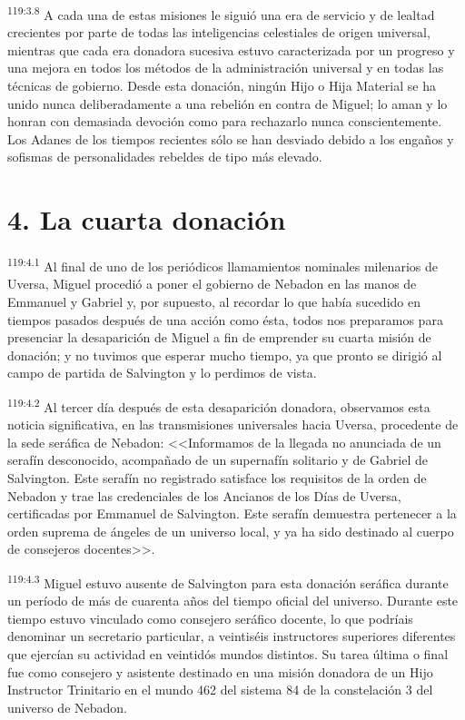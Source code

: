 \par
\textsuperscript{119:3.8} A cada una de estas misiones le siguió una era de servicio y de lealtad crecientes por parte de todas las inteligencias celestiales de origen universal, mientras que cada era donadora sucesiva estuvo caracterizada por un progreso y una mejora en todos los métodos de la administración universal y en todas las técnicas de gobierno. Desde esta donación, ningún Hijo o Hija Material se ha unido nunca deliberadamente a una rebelión en contra de Miguel; lo aman y lo honran con demasiada devoción como para rechazarlo nunca conscientemente. Los Adanes de los tiempos recientes sólo se han desviado debido a los engaños y sofismas de personalidades rebeldes de tipo más elevado.

\section*{4. La cuarta donación}
\par
\textsuperscript{119:4.1} Al final de uno de los periódicos llamamientos nominales milenarios de Uversa, Miguel procedió a poner el gobierno de Nebadon en las manos de Emmanuel y Gabriel y, por supuesto, al recordar lo que había sucedido en tiempos pasados después de una acción como ésta, todos nos preparamos para presenciar la desaparición de Miguel a fin de emprender su cuarta misión de donación; y no tuvimos que esperar mucho tiempo, ya que pronto se dirigió al campo de partida de Salvington y lo perdimos de vista.

\par
\textsuperscript{119:4.2} Al tercer día después de esta desaparición donadora, observamos esta noticia significativa, en las transmisiones universales hacia Uversa, procedente de la sede seráfica de Nebadon: <<Informamos de la llegada no anunciada de un serafín desconocido, acompañado de un supernafín solitario y de Gabriel de Salvington. Este serafín no registrado satisface los requisitos de la orden de Nebadon y trae las credenciales de los Ancianos de los Días de Uversa, certificadas por Emmanuel de Salvington. Este serafín demuestra pertenecer a la orden suprema de ángeles de un universo local, y ya ha sido destinado al cuerpo de consejeros docentes>>.

\par
\textsuperscript{119:4.3} Miguel estuvo ausente de Salvington para esta donación seráfica durante un período de más de cuarenta años del tiempo oficial del universo. Durante este tiempo estuvo vinculado como consejero seráfico docente, lo que podríais denominar un secretario particular, a veintiséis instructores superiores diferentes que ejercían su actividad en veintidós mundos distintos. Su tarea última o final fue como consejero y asistente destinado en una misión donadora de un Hijo Instructor Trinitario en el mundo 462 del sistema 84 de la constelación 3 del universo de Nebadon.

